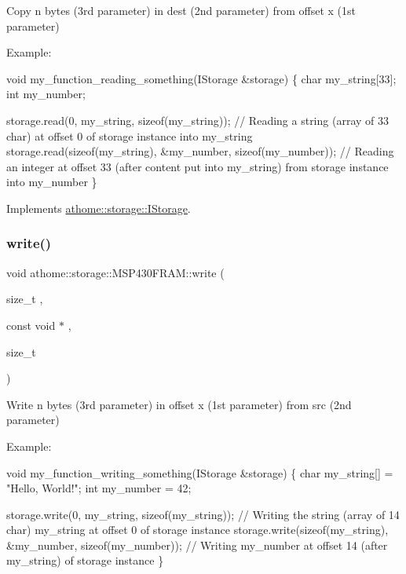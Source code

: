Copy n bytes (3rd parameter) in dest (2nd parameter) from offset x (1st parameter)

Example\+:


\begin{DoxyCode}
\textcolor{keywordtype}{void} my\_function\_reading\_something(IStorage &storage) \{
  \textcolor{keywordtype}{char} my\_string[33];
  \textcolor{keywordtype}{int} my\_number;

  storage.read(0, my\_string, \textcolor{keyword}{sizeof}(my\_string)); \textcolor{comment}{// Reading a string (array}
of 33 char) at offset 0 of storage instance into my\_string
  storage.read(\textcolor{keyword}{sizeof}(my\_string), &my\_number, \textcolor{keyword}{sizeof}(my\_number)); \textcolor{comment}{//}
Reading an integer at offset 33 (after content put into my\_string) from
storage instance into my\_number
\}
\end{DoxyCode}
 

Implements \mbox{\hyperlink{classathome_1_1storage_1_1_i_storage_af623393cdf559addf167463ce4e7005e}{athome\+::storage\+::\+I\+Storage}}.

\mbox{\label{classathome_1_1storage_1_1_m_s_p430_f_r_a_m_ae6b7a6d178233f9e54394360b34c3bca}} 
\subsubsection{\texorpdfstring{write()}{write()}}
{\footnotesize\ttfamily void athome\+::storage\+::\+M\+S\+P430\+F\+R\+A\+M\+::write (\begin{DoxyParamCaption}\item[{size\+\_\+t}]{,  }\item[{const void $\ast$}]{,  }\item[{size\+\_\+t}]{ }\end{DoxyParamCaption})\hspace{0.3cm}{\ttfamily [virtual]}}

Write n bytes (3rd parameter) in offset x (1st parameter) from src (2nd parameter)

Example\+:


\begin{DoxyCode}
\textcolor{keywordtype}{void} my\_function\_writing\_something(IStorage &storage) \{
  \textcolor{keywordtype}{char} my\_string[] = \textcolor{stringliteral}{"Hello, World!"};
  \textcolor{keywordtype}{int} my\_number = 42;

  storage.write(0, my\_string, \textcolor{keyword}{sizeof}(my\_string)); \textcolor{comment}{// Writing the string}
(array of 14 char) my\_string at offset 0 of storage instance
  storage.write(\textcolor{keyword}{sizeof}(my\_string), &my\_number, \textcolor{keyword}{sizeof}(my\_number)); \textcolor{comment}{//}
Writing my\_number at offset 14 (after my\_string) of storage instance
\}
\end{DoxyCode}
 

